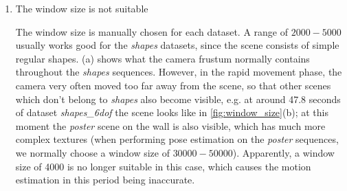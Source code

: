 \begin{enumerate}
\item The window size is not suitable

  The window size is manually chosen for each dataset. A range of
  $2000 - 5000$ usually works good for the \textit{shapes} datasets,
  since the scene consists of simple regular
  shapes. (a) shows what the camera frustum
  normally contains throughout the \emph{shapes} sequences. However,
  in the rapid movement phase, the camera very often moved too far
  away from the scene, so that other scenes which don't belong to
  \textit{shapes} also become visible, e.g. at around 47.8 seconds of
  dataset \emph{shapes\_6dof} the scene looks like
  in \cref{fig:window_size}(b); at this moment the \emph{poster} scene
  on the wall is also visible, which has much more complex textures
  (when performing pose estimation on the \textit{poster} sequences,
  we normally choose a window size of $30000-50000$). Apparently, a
  window size of 4000 is no longer suitable in this case, which causes
  the motion estimation in this period being inaccurate.


\end{enumerate}

